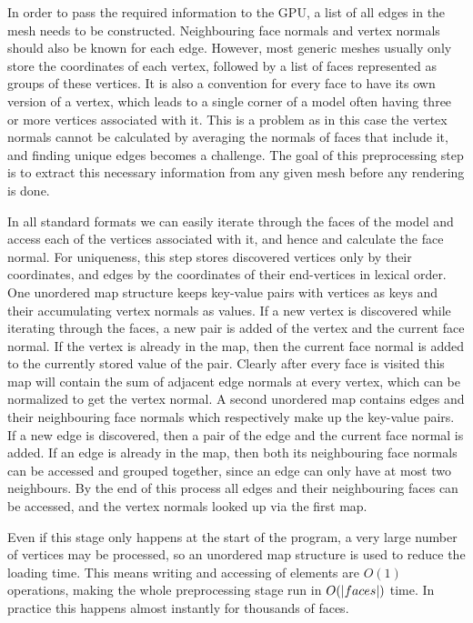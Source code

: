 \documentclass[a4paper, 12pt]{article}
\DeclarePairedDelimiter{\abs}{\lvert}{\rvert}
\begin{document}
In order to pass the required information to the GPU, a list of all edges in the mesh needs to be constructed. Neighbouring face normals and vertex normals should also be known for each edge. However, most generic meshes usually only store the coordinates of each vertex, followed by a list of faces represented as groups of these vertices. It is also a convention for every face to have its own version of a vertex, which leads to a single corner of a model often having three or more vertices associated with it. This is a problem as in this case the vertex normals cannot be calculated by averaging the normals of faces that include it, and finding unique edges becomes a challenge. The goal of this preprocessing step is to extract this necessary information from any given mesh before any rendering is done.

In all standard formats we can easily iterate through the faces of the model and access each of the vertices associated with it, and hence and calculate the face normal. For uniqueness, this step stores discovered vertices only by their coordinates, and edges by the coordinates of their end-vertices in lexical order. One unordered map structure keeps key-value pairs with vertices as keys and their accumulating vertex normals as values. If a new vertex is discovered while iterating through the faces, a new pair is added of the vertex and the current face normal. If the vertex is already in the map, then the current face normal is added to the currently stored value of the pair. Clearly after every face is visited this map will contain the sum of adjacent edge normals at every vertex, which can be normalized to get the vertex normal. A second unordered map contains edges and their neighbouring face normals which respectively make up the key-value pairs. If a new edge is discovered, then a pair of the edge and the current face normal is added. If an edge is already in the map, then both its neighbouring face normals can be accessed and grouped together, since an edge can only have at most two neighbours. By the end of this process all edges and their neighbouring faces can be accessed, and the vertex normals looked up via the first map.

Even if this stage only happens at the start of the program, a very large number of vertices may be processed, so an unordered map structure is used to reduce the loading time. This means writing and accessing of elements are $O(1)$ operations, making the whole preprocessing stage run in $O(\abs{faces})$ time. In practice this happens almost instantly for thousands of faces.
\end{document}
